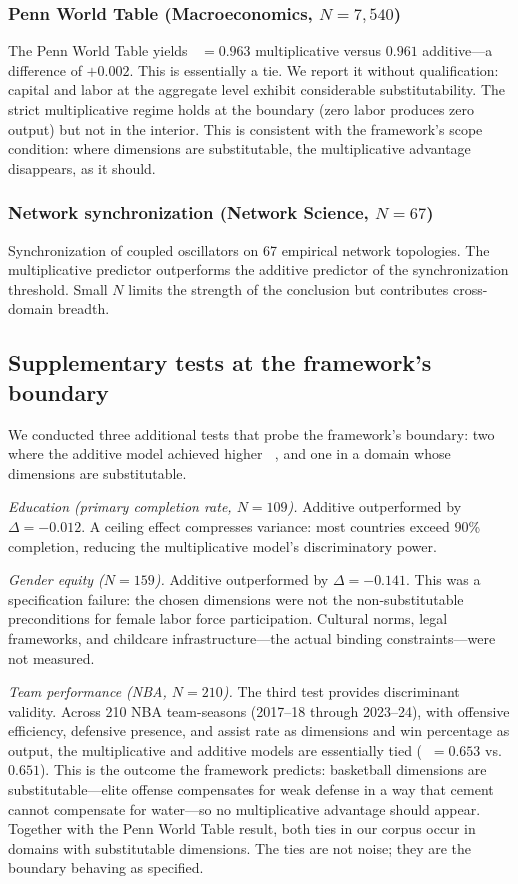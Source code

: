 \documentclass[12pt, a4paper]{article}
\theoremstyle{definition}
\theoremstyle{remark}
\DeclareMathOperator{\Spearman}{\rho_s}
\begin{document}
\subsubsection{Penn World Table (Macroeconomics, $N = 7{,}540$)}

The Penn World Table \cite{feenstra2015} yields $\Spearman = 0.963$ multiplicative versus $0.961$ additive---a difference of $+0.002$. This is essentially a tie. We report it without qualification: capital and labor at the aggregate level exhibit considerable substitutability. The strict multiplicative regime holds at the boundary (zero labor produces zero output) but not in the interior. This is consistent with the framework's scope condition: where dimensions are substitutable, the multiplicative advantage disappears, as it should.

\subsubsection{Network synchronization (Network Science, $N = 67$)}

Synchronization of coupled oscillators on 67 empirical network topologies. The multiplicative predictor outperforms the additive predictor of the synchronization threshold. Small $N$ limits the strength of the conclusion but contributes cross-domain breadth.

\subsection{Supplementary tests at the framework's boundary}

We conducted three additional tests that probe the framework's boundary: two where the additive model achieved higher $\Spearman$, and one in a domain whose dimensions are substitutable.

\textit{Education (primary completion rate, $N = 109$).} Additive outperformed by $\Delta = -0.012$. A ceiling effect compresses variance: most countries exceed 90\% completion, reducing the multiplicative model's discriminatory power.

\textit{Gender equity ($N = 159$).} Additive outperformed by $\Delta = -0.141$. This was a specification failure: the chosen dimensions were not the non-substitutable preconditions for female labor force participation. Cultural norms, legal frameworks, and childcare infrastructure---the actual binding constraints---were not measured.

\textit{Team performance (NBA, $N = 210$).} The third test provides discriminant validity. Across 210 NBA team-seasons (2017--18 through 2023--24), with offensive efficiency, defensive presence, and assist rate as dimensions and win percentage as output, the multiplicative and additive models are essentially tied ($\Spearman = 0.653$ vs.\ $0.651$). This is the outcome the framework predicts: basketball dimensions are substitutable---elite offense compensates for weak defense in a way that cement cannot compensate for water---so no multiplicative advantage should appear. Together with the Penn World Table result, both ties in our corpus occur in domains with substitutable dimensions. The ties are not noise; they are the boundary behaving as specified.
\end{document}
